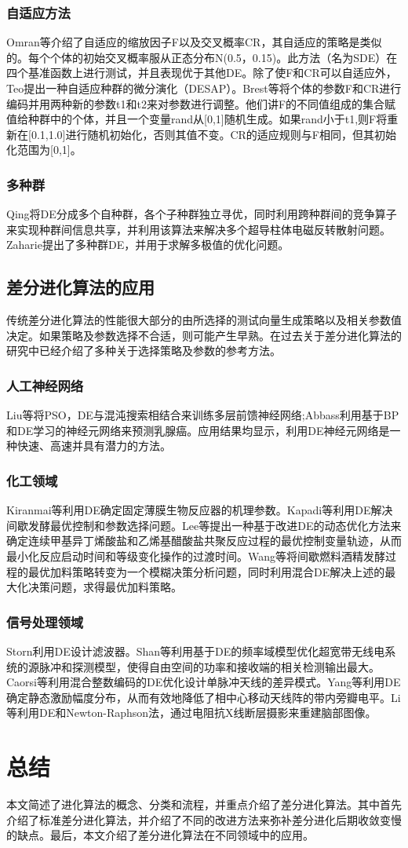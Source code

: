 \documentclass[12pt]{article}
\begin{document}
\subsubsection{自适应方法}
Omran等介绍了自适应的缩放因子F以及交叉概率CR，其自适应的策略是类似的。每个个体的初始交叉概率服从正态分布N(0.5，0.15)。此方法（名为SDE）在四个基准函数上进行测试，并且表现优于其他DE。除了使F和CR可以自适应外，Teo提出一种自适应种群的微分演化（DESAP）。Brest等将个体的参数F和CR进行编码并用两种新的参数t1和t2来对参数进行调整。他们讲F的不同值组成的集合赋值给种群中的个体，并且一个变量rand从[0,1]随机生成。如果rand小于t1,则F将重新在[0.1,1.0]进行随机初始化，否则其值不变。CR的适应规则与F相同，但其初始化范围为[0,1]。

\subsubsection{多种群}
Qing将DE分成多个自种群，各个子种群独立寻优，同时利用跨种群间的竞争算子来实现种群间信息共享，并利用该算法来解决多个超导柱体电磁反转散射问题。Zaharie提出了多种群DE，并用于求解多极值的优化问题。

\subsection{差分进化算法的应用}
传统差分进化算法的性能很大部分的由所选择的测试向量生成策略以及相关参数值决定。如果策略及参数选择不合适，则可能产生早熟。在过去关于差分进化算法的研究中已经介绍了多种关于选择策略及参数的参考方法。

\subsubsection{人工神经网络}
Liu等将PSO，DE与混沌搜索相结合来训练多层前馈神经网络;Abbass利用基于BP和DE学习的神经元网络来预测乳腺癌。应用结果均显示，利用DE神经元网络是一种快速、高速并具有潜力的方法。

\subsubsection{化工领域}
Kiranmai等利用DE确定固定薄膜生物反应器的机理参数。Kapadi等利用DE解决间歇发酵最优控制和参数选择问题。Lee等提出一种基于改进DE的动态优化方法来确定连续甲基异丁烯酸盐和乙烯基醋酸盐共聚反应过程的最优控制变量轨迹，从而最小化反应启动时间和等级变化操作的过渡时间。Wang等将间歇燃料酒精发酵过程的最优加料策略转变为一个模糊决策分析问题，同时利用混合DE解决上述的最大化决策问题，求得最优加料策略。

\subsubsection{信号处理领域}
Storn利用DE设计滤波器。Shan等利用基于DE的频率域模型优化超宽带无线电系统的源脉冲和探测模型，使得自由空间的功率和接收端的相关检测输出最大。Caorsi等利用混合整数编码的DE优化设计单脉冲天线的差异模式。Yang等利用DE确定静态激励幅度分布，从而有效地降低了相中心移动天线阵的带内旁瓣电平。Li等利用DE和Newton-Raphson法，通过电阻抗X线断层摄影来重建脑部图像。

\section{总结}
本文简述了进化算法的概念、分类和流程，并重点介绍了差分进化算法。其中首先介绍了标准差分进化算法，并介绍了不同的改进方法来弥补差分进化后期收敛变慢的缺点。最后，本文介绍了差分进化算法在不同领域中的应用。
\end{document}

